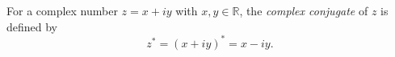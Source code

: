 For a complex number $z = x + iy$ with $x, y \in \mathbb{R}$, the \textit{complex conjugate} of $z$ is defined by
\begin{equation*}
z^* = (x + iy)^* = x - iy.
\end{equation*}
